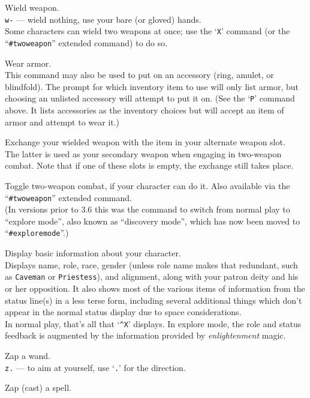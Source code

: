 Wield weapon.\\
{\tt w-} --- wield nothing, use your bare (or gloved) hands.\\
Some characters can wield two weapons at once; use the `{\tt X}' command
(or the ``{\tt \#twoweapon}'' extended command) to do so.
\item[\tb{W}]
Wear armor.\\
This command may also be used to put on an accessory (ring, amulet, or
blindfold).  The prompt for which inventory item to use will only list
armor, but choosing an unlisted accessory will attempt to put it on.
(See the `{\tt P}' command above.  It lists accessories as the inventory
choices but will accept an item of armor and attempt to wear it.)
\item[\tb{x}]
Exchange your wielded weapon with the item in your alternate weapon slot.\\
The latter is used as your secondary weapon when engaging in
two-weapon combat.  Note that if one of these slots is empty,
the exchange still takes place.
\item[\tb{X}]
Toggle two-weapon combat, if your character can do it.  Also available
via the ``{\tt \#twoweapon}'' extended command.\\
(In versions prior to 3.6 this was the command to switch from normal
play to ``explore mode'', also known as ``discovery mode'', which has now
been moved to ``{\tt \#exploremode}''.)
\item[\tb{\^{}X}]
Display basic information about your character.\\
Displays name, role, race, gender (unless role name makes that
redundant, such as {\tt Caveman} or {\tt Priestess}), and alignment,
along with your patron deity and his or her opposition.  It also
shows most of the various items of information from the status line(s)
in a less terse form, including several additional things which don't
appear in the normal status display due to space considerations.\\
In normal play, that's all that `{\tt \^{}X}' displays.
In explore mode, the role and status feedback is augmented by the
information provided by {\it enlightenment\/} magic.
\item[\tb{z}]
Zap a wand.\\
{\tt z.} --- to aim at yourself, use `{\tt .}' for the direction.
\item[\tb{Z}]
Zap (cast) a spell.\\
